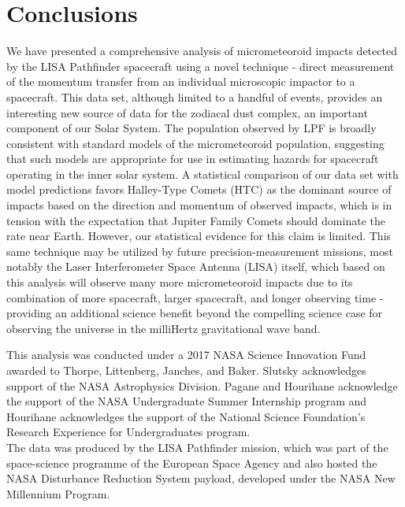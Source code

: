 \documentclass[twocolumn, trackchanges]{aastex62}
\begin{document}
\section{Conclusions} \label{sec:conclusions}
We have presented a comprehensive analysis of micrometeoroid impacts detected by the LISA Pathfinder spacecraft using a novel technique - direct measurement of the momentum transfer from an individual microscopic impactor to a spacecraft. This data set, although limited to a handful of events, provides an interesting new source of data for the zodiacal dust complex, an important component of our Solar System.  The population observed by LPF is broadly consistent with standard models of the micrometeoroid population, suggesting that such models are appropriate for use in estimating hazards for spacecraft operating in the inner solar system.  A statistical comparison of our data set with model predictions favors Halley-Type Comets (HTC) as the dominant source of impacts based on the direction and momentum of observed impacts, which is in tension with the expectation that Jupiter Family Comets should dominate the rate near Earth. However, our statistical evidence for this claim is limited.  This same technique may be utilized by future precision-measurement missions, most notably the Laser Interferometer Space Antenna (LISA) itself, which based on this analysis will observe many more micrometeoroid impacts due to its combination of more spacecraft, larger spacecraft, and longer observing time - providing an additional science benefit beyond the compelling science case for observing the universe in the milliHertz gravitational wave band.

\acknowledgments

This analysis was conducted under a 2017 NASA Science Innovation Fund awarded to Thorpe, Littenberg, Janches, and Baker. Slutsky acknowledges support of the NASA Astrophysics Division. Pagane and Hourihane acknowledge the support of the NASA Undergraduate Summer Internship program and Hourihane acknowledges the support of the National Science Foundation's Research Experience for Undergraduates program.
\\

The data was produced by the LISA Pathfinder mission, which was part of the
space-science programme of the European Space Agency and also hosted the NASA Disturbance Reduction System payload, developed under the NASA New Millennium Program. 
\end{document}
